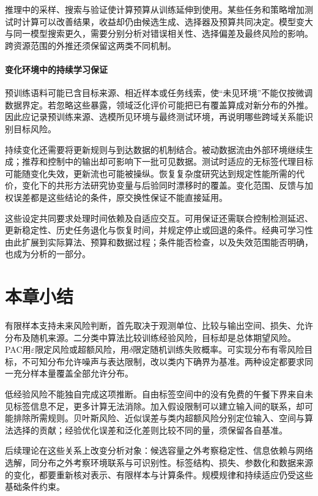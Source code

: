 推理中的采样、搜索与验证使计算预算从训练延伸到使用。某些任务和策略增加测试时计算可以改善结果，收益却仍由候选生成、选择器及预算共同决定。模型变大与同一模型搜索更久，需要分别分析对错误相关性、选择偏差及最终风险的影响。跨资源范围的外推还须保留这两类不同机制。

\paragraph{变化环境中的持续学习保证}

预训练语料可能已含目标来源、相近样本或任务线索，使“未见环境”不能仅按微调数据界定。若忽略这些暴露，领域泛化评价可能把已有覆盖算成对新分布的外推。因此应记录预训练来源、选模所见环境与最终测试环境，再说明哪些跨域关系能识别目标风险。

持续变化还需要将更新规则与到达数据的机制结合。被动数据流由外部环境继续生成；推荐和控制中的输出却可影响下一批可见数据。测试时适应的无标签代理目标可能随变化失效，更新流也可能被操纵。恢复复杂度研究达到规定性能所需的代价，变化下的共形方法研究协变量与后验同时漂移时的覆盖。变化范围、反馈与加权误差都是这些结论的条件，原交换性保证不能直接延用。

这些设定共同要求处理时间依赖及自适应交互。可用保证还需联合控制检测延迟、更新稳定性、历史任务退化与恢复时间，并规定停止或回退的条件。经典可学习性由此扩展到实际算法、预算和数据过程；条件能否检查，以及失效范围能否明确，也成为分析的一部分。

\section{本章小结}
\label{sec:statistical-framework-summary}

有限样本支持未来风险判断，首先取决于观测单位、比较与输出空间、损失、允许分布及随机来源。二分类中算法比较训练经验风险，目标却是总体期望风险。PAC用$\varepsilon$限定风险或超额风险，用$\delta$限定随机训练失败概率。可实现分布有零风险目标，不可知分布允许噪声与表达限制，改以类内下确界为基准。两种设定都要求同一充分样本量覆盖全部允许分布。

低经验风险不能独自完成这项推断。自由标签空间中的没有免费的午餐下界来自未见标签信息不足，更多计算无法消除。加入假设限制可以建立输入间的联系，却可能排除所需规则。贝叶斯风险、近似误差与类内超额风险分别定位输入、空间与算法选择的贡献；经验优化误差和泛化差则比较不同的量，须保留各自基准。

后续理论在这些关系上改变分析对象：候选容量之外考察稳定性、信息依赖与网络选解，同分布之外考察环境联系与可识别性。标签结构、损失、参数化和数据来源的变化，都要重新核对表示、有限样本与计算条件。规模规律和持续适应仍受这些基础条件约束。

